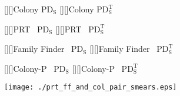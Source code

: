 \documentclass[11pt]{article}
\newcommand{\PDS}{\mathrm{PD_S}}
\newcommand{\PDST}{\mathrm{PD_S^T}}
\begin{document}
\pagestyle{empty}

\begin{center}
[][]{{\sf Colony} $\PDS$}
[][]{{\sf Colony} $\PDST$}

[][]{{\sf PRT~} $\PDS$}
[][]{{\sf PRT~} $\PDST$}

[][]{{\sf Family Finder~} $\PDS$}
[][]{{\sf Family Finder~} $\PDST$}

[][]{{\sf Colony-P~} $\PDS$}
[][]{{\sf Colony-P~} $\PDST$}


\texttt{[image: ./prt\_ff\_and\_col\_pair\_smears.eps]}

\end{center}




 
\end{document}

